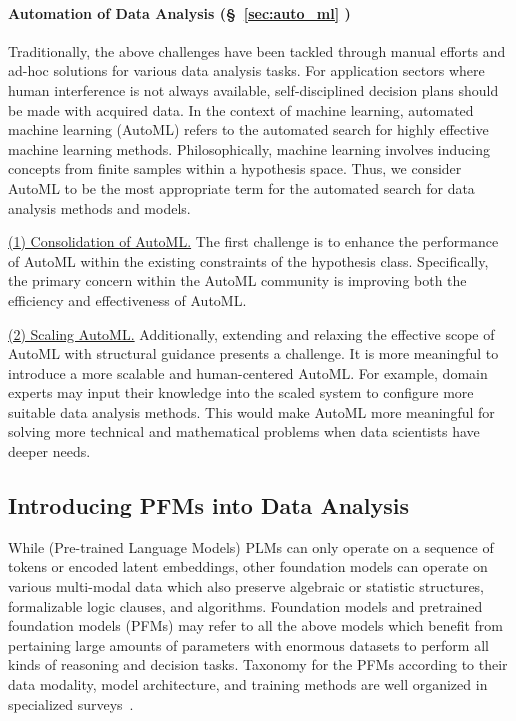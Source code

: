   \paragraph{Automation of Data Analysis (\S~\ref{sec:auto_ml}
  )} Traditionally, the above challenges have been tackled through manual efforts and ad-hoc solutions for various data analysis tasks. For application sectors where human interference is not always available, self-disciplined decision plans should be made with acquired data. In the context of machine learning, automated machine learning (AutoML) refers to the automated search for highly effective machine learning methods. Philosophically, machine learning involves inducing concepts from finite samples within a hypothesis space. Thus, we consider AutoML to be the most appropriate term for the automated search for data analysis methods and models. 
  
  \underline{(1) Consolidation of AutoML.} The first challenge is to enhance the performance of AutoML within the existing constraints of the hypothesis class. Specifically, the primary concern within the AutoML community is improving both the efficiency and effectiveness of AutoML. 
  
  \underline{(2) Scaling AutoML.} Additionally, extending and relaxing the effective scope of AutoML with structural guidance presents a challenge. It is more meaningful to introduce a more scalable and human-centered AutoML. For example, domain experts may input their knowledge into the scaled system to configure more suitable data analysis methods. This would make AutoML more meaningful for solving more technical and mathematical problems when data scientists have deeper needs.
  
  
  \subsection{Introducing PFMs into Data Analysis} %
  
  While (Pre-trained Language Models) PLMs can only operate on a sequence of tokens or encoded latent embeddings, other foundation models can operate on various multi-modal data which also preserve algebraic or statistic structures, formalizable logic clauses, and algorithms. Foundation models and pretrained foundation models (PFMs) may refer to all the above models which benefit from pertaining large amounts of parameters with enormous datasets to perform all kinds of reasoning and decision tasks. Taxonomy for the PFMs according to their data modality, model architecture, and training methods are well organized in specialized surveys~\cite{YangJTHFJZYH24,zhou2023comprehensive,LiangWNJ0SPW24,videounderstanding,yin2023survey,wu2023multimodal}. 
  
